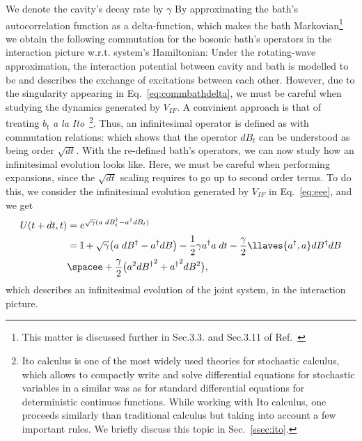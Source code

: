 We denote the cavity's decay rate by $\gamma$  By approximating the bath's autocorrelation function as a delta-function, which makes the bath Markovian\footnote{This matter is discussed further in Sec.3.3. and Sec.3.11 of Ref.~\cite{wisemanbook}} we obtain the following commutation for the bosonic bath's operators in the interaction picture w.r.t. system's Hamiltonian:%
Under the rotating-wave approximation, the interaction potential between cavity and bath is modelled to be
and describes the exchange of excitations between each other. However, due to the singularity appearing in Eq.~\ref{eq:commbathdelta}, we must be careful when studying the dynamics generated by $V_{IF}$. A convinient approach is that of treating $b_t$ \textit{a la Ito}~\cite{wiseman1993interpretation}\footnote{Ito calculus is one of the most widely used theories for stochastic calculus, which allows to compactly write and solve differential equations for stochastic variables in a similar was as for standard differential equations for deterministic continuos functions. While working with Ito calculus, one proceeds similarly than traditional calculus but taking into account a few important rules. We briefly discuss this topic in Sec.~\ref{ssec:ito}.}. Thus, an infinitesimal operator is defined as
 with commutation relations:
 which shows that the operator $dB_t$ can be understood as being order $\sqrt{dt}$. With the re-defined bath's operators, we can now study how an infinitesimal evolution looks like. Here, we must be careful when performing expansions, since the $\sqrt{dt}$ scaling requires to go up to second order terms. To do this, we consider the infinitesimal evolution generated by $V_{IF}$ in Eq.~\ref{eq:eee}, and we get
\begin{align}
U(t+dt,t) &= e^{\sqrt{\gamma}(a \; dB_t^\dagger - a^\dagger dB_t)} \nonumber\\
&= \mathbb{I} + \sqrt{\gamma} \big( a  \; dB^\dagger - a^\dagger dB\big) - \frac{1}{2} \gamma a^\dagger a \;dt - \frac{\gamma}{2}\llaves{a^\dagger, a} dB^\dagger dB  \\ & \spacee+\frac{\gamma}{2} \big(a^2 {dB^\dagger}^2 + {a^\dagger}^2 dB^2\big) \nonumber,
\end{align}
which describes an infinitesimal evolution of the joint system, in the interaction picture.


